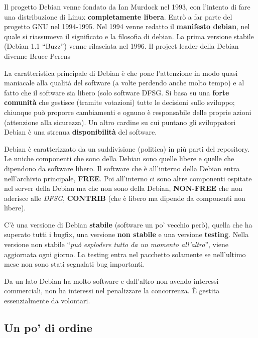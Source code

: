 Il progetto Debian venne fondato da Ian Murdock nel 1993, con l'intento di fare una distribuzione di Linux \textbf{completamente libera}. Entrò a far parte del progetto GNU nel 1994-1995. Nel 1994 venne redatto il \textbf{manifesto debian}, nel quale si riassumeva il significato e la filosofia di debian. La prima versione stabile (Debian 1.1 ``Buzz'') venne rilasciata nel 1996. Il project leader della Debian divenne Bruce Perens

La caratteristica principale di Debian è che pone l'attenzione in modo quasi maniacale alla qualità del software (a volte perdendo anche molto tempo) e al fatto che il software sia libero (solo software DFSG. Si basa su una \textbf{forte comunità} che gestisce (tramite votazioni) tutte le decisioni sullo sviluppo; chiunque può proporre cambiamenti e ognuno è responsabile delle proprie azioni (attenzione alla sicurezza). Un altro cardine su cui puntano gli sviluppatori Debian è una strenua \textbf{disponibilità} del software.

Debian è caratterizzato da un suddivisione (politica) in più parti del repository. Le uniche componenti che sono della Debian sono quelle libere e quelle che dipendono da software libero. Il software che è all'interno della Debian entra nell'archivio principale, \textbf{FREE}. Poi all'interno ci sono altre componenti ospitate nel server della Debian ma che non sono della Debian, \textbf{NON-FREE} che non aderisce alle \textit{DFSG}, \textbf{CONTRIB} (che è libero ma dipende da componenti non libere).

C'è una versione di Debian \textbf{stabile} (software un po' vecchio però), quella che ha superato tutti i bugfix, una versione \textbf{non stabile} e una versione \textbf{testing}. Nella versione non stabile ``\textit{può esplodere tutto da un momento all'altro}'', viene aggiornata ogni giorno. La testing entra nel pacchetto solamente se nell'ultimo mese non sono stati segnalati bug importanti.

Da un lato Debian ha molto software e dall'altro non avendo interessi commerciali, non ha interessi nel penalizzare la concorrenza. È gestita essenzialmente da volontari.

\subsection{Un po' di ordine}

